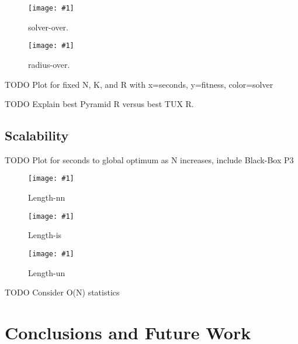 \documentclass{sig-alternate}
\newcommand{\includegraphicsfit}[1]
{\texttt{[image: \#1]}}
\newcommand{\includegraphicswide}[1]
{\texttt{[image: \#1]}}
\begin{document}
\begin{figure*}
  \centering
  \includegraphicswide{solver-over}
  \caption{solver-over.}
  \label{fig-solver-over}
\end{figure*}

\begin{figure*}
  \centering
  \includegraphicswide{radius-over}
  \caption{radius-over.}
  \label{fig-radius-over}
\end{figure*}


TODO Plot for fixed N, K, and R with x=seconds, y=fitness, color=solver

TODO Explain best Pyramid R versus best TUX R.

\subsection{Scalability}
TODO Plot for seconds to global optimum as N increases, include Black-Box P3

\begin{figure}
  \centering
  \includegraphicsfit{length-nn}
  \caption{Length-nn}
  \label{fig-length-nn}
\end{figure}

\begin{figure}
  \centering
  \includegraphicsfit{length-is}
  \caption{Length-is}
  \label{fig-length-is}
\end{figure}

\begin{figure}
  \centering
  \includegraphicsfit{length-un}
  \caption{Length-un}
  \label{fig-length-un}
\end{figure}

TODO Consider O(N) statistics

\section{Conclusions and Future Work}
%

%
%
\balancecolumns
\end{document}
